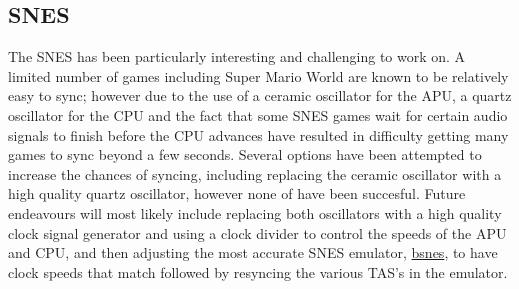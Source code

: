 \documentclass{article}
\begin{document}
\subsection{SNES}
The SNES has been particularly interesting and challenging to work on.  A limited number of games including Super Mario World are known to be relatively easy to sync; however due to the use of a ceramic oscillator for the APU, a quartz oscillator for the CPU and the fact that some SNES games wait for certain audio signals to finish before the CPU advances have resulted in difficulty getting many games to sync beyond a few seconds.  Several options have been attempted to increase the chances of syncing, including replacing the ceramic oscillator with a high quality quartz oscillator, however none of have been succesful.  Future endeavours will most likely include replacing both oscillators with a high quality clock signal generator and using a clock divider to control the speeds of the APU and CPU, and then adjusting the most accurate SNES emulator, \href{https://byuu.org/emulation/bsnes/}{bsnes}, to have clock speeds that match followed by resyncing the various TAS's in the emulator.


  
\end{document}
